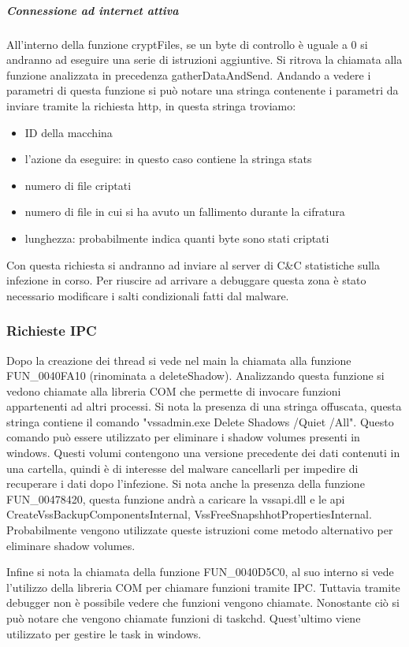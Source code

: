 \documentclass[a4paper,12pt]{article}
\begin{document}
\subparagraph{Connessione ad internet attiva}
All'interno della funzione cryptFiles, se un byte di controllo è uguale a 0 si andranno ad eseguire una serie di istruzioni aggiuntive. Si ritrova la chiamata alla funzione analizzata in precedenza gatherDataAndSend. Andando a vedere i parametri di questa funzione si può notare una stringa contenente i parametri da inviare tramite la richiesta http, in questa stringa troviamo: \begin{itemize}
	\item ID della macchina
	\item l'azione da eseguire: in questo caso contiene la stringa stats
	\item numero di file criptati
	\item numero di file in cui si ha avuto un fallimento durante la cifratura
	\item lunghezza: probabilmente indica quanti byte sono stati criptati
\end{itemize} 

Con questa richiesta si andranno ad inviare al server di C\&C statistiche sulla infezione in corso. Per riuscire ad arrivare a debuggare questa zona è stato necessario modificare i salti condizionali fatti dal malware.

\subsubsection{Richieste IPC}
Dopo la creazione dei thread si vede nel main la chiamata alla funzione FUN\_0040FA10 (rinominata a deleteShadow). Analizzando questa funzione si vedono chiamate alla libreria COM che permette di invocare funzioni appartenenti ad altri processi.  Si nota la presenza di una stringa offuscata, questa stringa contiene il comando "vssadmin.exe Delete Shadows /Quiet /All". Questo comando può essere utilizzato per eliminare i shadow volumes presenti in windows. Questi volumi contengono una versione precedente dei dati contenuti in una cartella, quindi è di interesse del malware cancellarli per impedire di recuperare i dati dopo l'infezione. Si nota anche la presenza della funzione FUN\_00478420, questa funzione andrà a caricare la vssapi.dll e le api CreateVssBackupComponentsInternal, VssFreeSnapshhotPropertiesInternal. Probabilmente vengono utilizzate queste istruzioni come metodo alternativo per eliminare shadow volumes. 

Infine si nota la chiamata della funzione FUN\_0040D5C0, al suo interno si vede l'utilizzo della libreria COM per chiamare funzioni tramite IPC. Tuttavia tramite debugger non è possibile vedere che funzioni vengono chiamate. Nonostante ciò si può notare che vengono chiamate funzioni di taskchd. Quest'ultimo viene utilizzato per gestire le task in windows. 
  
\end{document}
